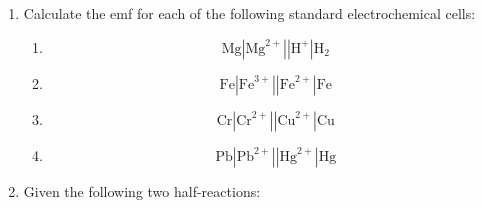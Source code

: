 {\begin{enumerate}
	\begin{enumerate}
	\item{Write down the standard conditions which apply to this electrochemical cell.}
	\item{Identify the metal M. Show calculations.}
	\item Use the standard electrode potentials to write down equations for the:
		\begin{enumerate}
		\item{cathode half-reaction}
		\item{anode half-reaction}
		\item{overall cell reaction}
		\end{enumerate}
	\item{What is the purpose of the salt bridge?}
	\item{Explain why a KCl solution would not be suitable for use in the salt bridge in this cell.}
	\end{enumerate}

(IEB Paper 2, 2004)

\item Calculate the emf for each of the following standard electrochemical cells:

	\begin{enumerate}

\item 
\begin{equation*}
\text{Mg}|\text{Mg}^{2+}||\text{H}^{+}|\text{H}_{2}
\end{equation*}

\item
\begin{equation*}
\text{Fe}|\text{Fe}^{3+}||\text{Fe}^{2+}|\text{Fe}
\end{equation*}


\item
\begin{equation*}
\text{Cr}|\text{Cr}^{2+}||\text{Cu}^{2+}|\text{Cu}
\end{equation*}


\item
\begin{equation*}
\text{Pb}|\text{Pb}^{2+}||\text{Hg}^{2+}|\text{Hg}
\end{equation*}

\end{enumerate}

\item Given the following two half-reactions:


\end{enumerate}}
